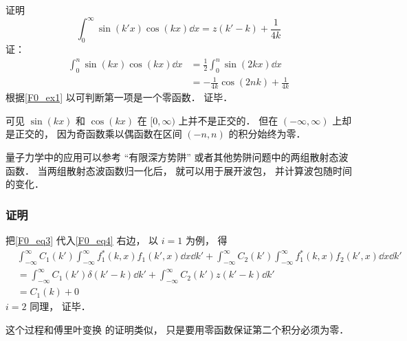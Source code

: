 \begin{example}{}
证明
\begin{equation}
\int_0^\infty \sin(k'x)\cos(kx) \dd{x} = z(k' - k) + \frac{1}{4k}
\end{equation}
证：
\begin{equation}
\begin{aligned}
\int_0^n \sin(kx)\cos(kx) \dd{x} &= \frac{1}{2} \int_0^n \sin(2kx) \dd{x}\\
&= -\frac{1}{4k}\cos(2nk) + \frac{1}{4k}
\end{aligned}
\end{equation}
根据\autoref{F0_ex1} 以可判断第一项是一个零函数． 证毕．

可见 $\sin(kx)$ 和 $\cos(kx)$ 在 $[0,\infty)$ 上并不是正交的． 但在 $(-\infty, \infty)$ 上却是正交的， 因为奇函数乘以偶函数在区间 $(-n, n)$ 的积分始终为零．
\end{example}

量子力学中的应用可以参考 “有限深方势阱” 或者其他势阱问题中的两组散射态波函数． 当两组散射态波函数归一化后， 就可以用于展开波包， 并计算波包随时间的变化．

\subsubsection{证明}
把\autoref{F0_eq3} 代入\autoref{F0_eq4} 右边， 以 $i = 1$ 为例， 得
\begin{equation}
\begin{aligned}
&\int_{-\infty}^{\infty} C_1(k') \int_{-\infty}^{\infty} f_1^*(k, x) f_1(k', x)\dd{x} \dd{k'} + \int_{-\infty}^{\infty} C_2(k') \int_{-\infty}^{\infty} f_1^*(k, x)f_2(k', x)\dd{x} \dd{k'}\\
&= \int_{-\infty}^{\infty} C_1(k') \delta(k' - k) \dd{k'} + \int_{-\infty}^{\infty} C_2(k') z(k' - k) \dd{k'}\\
&= C_1(k) + 0
\end{aligned}
\end{equation}
$i = 2$ 同理， 证毕．

这个过程和傅里叶变换 的证明类似， 只是要用零函数保证第二个积分必须为零．

